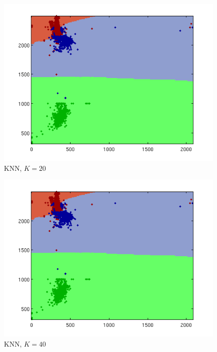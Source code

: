 \documentclass[a4paper]{article}
\begin{document}
\begin{figure}[htbp!]
\center
\includegraphics[clip, trim=40px 15px 30px 10px]{knn_real.png}
\caption{KNN, $K=20$}
\end{figure}

\begin{figure}[htbp!]
\center
\includegraphics[clip, trim=40px 15px 30px 10px]{knn_real.png}
\caption{KNN, $K=40$}
\end{figure}
\end{document}
